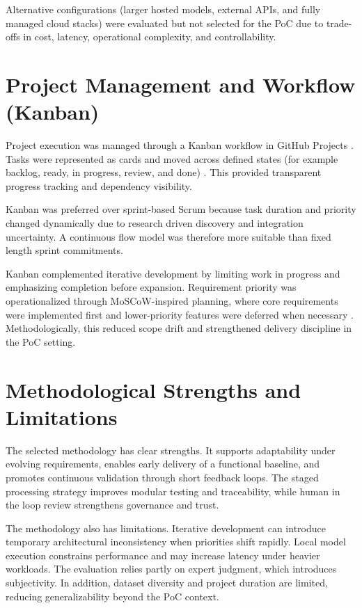 Alternative configurations (larger hosted models, external APIs, and fully managed cloud stacks) were evaluated but not selected for the PoC due to trade-offs in cost, latency, operational complexity, and controllability.

\section{Project Management and Workflow (Kanban)}

Project execution was managed through a Kanban workflow in GitHub Projects \cite{kanban}.
Tasks were represented as cards and moved across defined states (for example backlog, ready, in progress, review, and done) \cite{our_Kanban_workflow_in_GitHub}.
This provided transparent progress tracking and dependency visibility.

Kanban was preferred over sprint-based Scrum because task duration and priority changed dynamically due to research driven discovery and integration uncertainty.
A continuous flow model was therefore more suitable than fixed length sprint commitments.

\vspace{0.3cm}

Kanban complemented iterative development by limiting work in progress and emphasizing completion before expansion.
Requirement priority was operationalized through MoSCoW-inspired planning, where core requirements were implemented first and lower-priority features were deferred when necessary \cite{productplan_moscow}.
Methodologically, this reduced scope drift and strengthened delivery discipline in the PoC setting.

\section{Methodological Strengths and Limitations}

The selected methodology has clear strengths.
It supports adaptability under evolving requirements, enables early delivery of a functional baseline, and promotes continuous validation through short feedback loops.
The staged processing strategy improves modular testing and traceability, while human in the loop review strengthens governance and trust.

\vspace{0.3cm}

The methodology also has limitations.
Iterative development can introduce temporary architectural inconsistency when priorities shift rapidly.
Local model execution constrains performance and may increase latency under heavier workloads.
The evaluation relies partly on expert judgment, which introduces subjectivity.
In addition, dataset diversity and project duration are limited, reducing generalizability beyond the PoC context.

